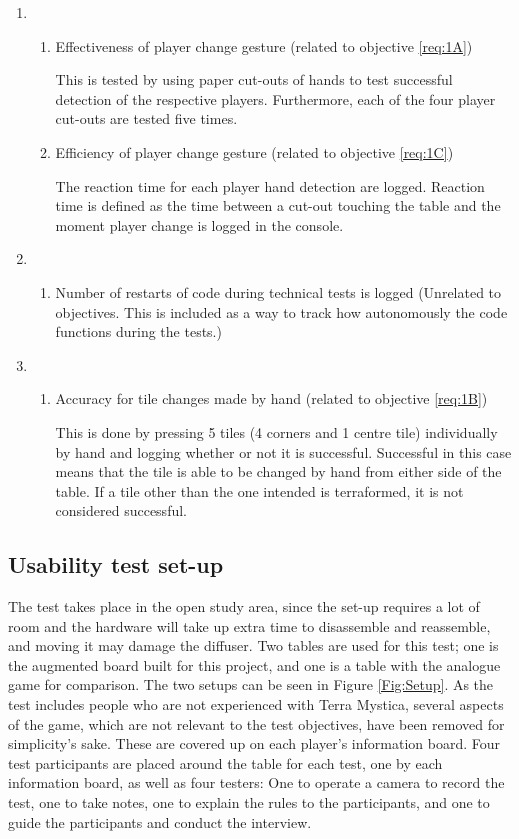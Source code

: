 \begin{enumerate}
	
\item \begin{enumerate}
\item Effectiveness of player change gesture (related to objective \ref{req:1A})

This is tested by using paper cut-outs of hands to test successful detection of the respective players. Furthermore, each of the four player cut-outs are tested five times.

\item Efficiency of player change gesture (related to objective \ref{req:1C})

The reaction time for each player hand detection are logged. Reaction time is defined as the time between a cut-out touching the table and the moment player change is logged in the console.
\end{enumerate}
	\item \begin{enumerate}
		\item Number of restarts of code during technical tests is logged (Unrelated to objectives. This is included as a way to track how autonomously the code functions during the tests.)
	\end{enumerate}
	\item \begin{enumerate}
		\item Accuracy for tile changes made by hand (related to objective \ref{req:1B})
		
		This is done by pressing 5 tiles (4 corners and 1 centre tile) individually by hand and logging whether or not it is successful. Successful in this case means that the tile is able to be changed by hand from either side of the table. If a tile other than the one intended is terraformed, it is not considered successful.
	\end{enumerate}
\end{enumerate}

\subsection{Usability test set-up}
The test takes place in the open study area, since the set-up requires a lot of room and the hardware will take up extra time to disassemble and reassemble, and moving it may damage the diffuser. Two tables are used for this test; one is the augmented board built for this project, and one is a table with the analogue game for comparison. The two setups can be seen in Figure \ref{Fig:Setup}. As the test includes people who are not experienced with Terra Mystica, several aspects of the game, which are not relevant to the test objectives, have been removed for simplicity's sake. These are covered up on each player's information board. Four test participants are placed around the table for each test, one by each information board, as well as four testers: One to operate a camera to record the test, one to take notes, one to explain the rules to the participants, and one to guide the participants and conduct the interview.


